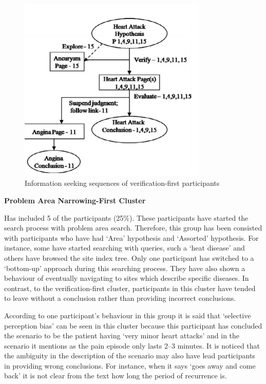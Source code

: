 \documentclass[]{article}
\begin{document}
\begin{figure}[t!]
	\includegraphics[width=0.8\textwidth]{Capture11.png}
	\caption{Information seeking sequences of verification-first participants\label{fig11}}
\end{figure}

\textbf{Problem Area Narrowing-First Cluster}

Has included 5 of the participants (25\%). These participants have started the search process with problem area search. Therefore, this group has been consisted with participants who have had ‘Area’ hypothesis and ‘Assorted’ hypothesis. For instance, some have started searching with queries, such a ‘heat disease’ and others have browsed the site index tree. Only one participant has switched to a ‘bottom-up’ approach during this searching process. They have also shown a behaviour of eventually navigating to sites which describe specific diseases. In contrast, to the verification-first cluster, participants in this cluster have tended to leave without a conclusion rather than providing incorrect conclusions. 

According to one participant’s behaviour in this group it is said that ‘selective perception bias’ can be seen in this cluster because this participant has concluded the scenario to be the patient having ‘very minor heart attacks’ and in the scenario it mentions as the pain episode only lasts 2–3 minutes. It is noticed that the ambiguity in the description of the scenario may also have lead participants in providing wrong conclusions. For instance, when it says ‘goes away and come back’ it is not clear from the text how long the period of recurrence is. 
     
\end{document}
